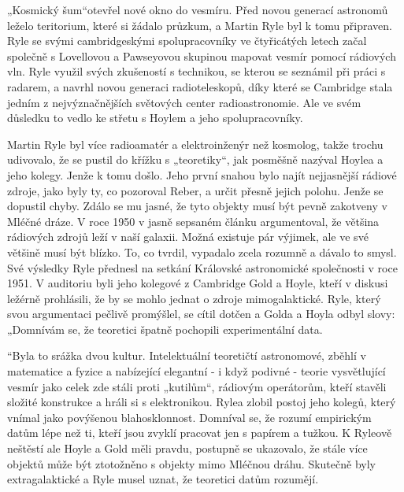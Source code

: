   „Kosmický šum“otevřel nové okno do vesmíru. Před novou generací astronomů leželo teritorium, které
  si žádalo průzkum, a Martin Ryle byl k tomu připraven. Ryle se svými cambridgeskými
  spolupracovníky ve čtyřicátých letech začal společně s Lovellovou a Pawseyovou skupinou mapovat
  vesmír pomocí rádiových vln. Ryle využil svých zkušeností s technikou, se kterou se seznámil při
  práci s radarem, a navrhl novou generaci radioteleskopů, díky které se Cambridge stala jedním z
  nejvýznačnějších světových center radioastronomie. Ale ve svém důsledku to vedlo ke střetu s
  Hoylem a jeho spolupracovníky. 

  Martin Ryle byl více radioamatér a elektroinženýr než kosmolog, takže trochu udivovalo, že se
  pustil do křížku s „teoretiky“, jak posměšně nazýval Hoylea a jeho kolegy. Jenže k tomu došlo.
  Jeho první snahou bylo najít nejjasnější rádiové zdroje, jako byly ty, co pozoroval Reber, a určit
  přesně jejich polohu. Jenže se dopustil chyby. Zdálo se mu jasné, že tyto objekty musí být pevně
  zakotveny v Mléčné dráze. V roce 1950 v jasně sepsaném článku argumentoval, že většina rádiových
  zdrojů leží v naší galaxii. Možná existuje pár výjimek, ale ve své většině musí být blízko. To, co
  tvrdil, vypadalo zcela rozumně a dávalo to smysl. Své výsledky Ryle přednesl na setkání Královské
  astronomické společnosti v roce 1951. V auditoriu byli jeho kolegové z Cambridge Gold a Hoyle,
  kteří v diskusi ležérně prohlásili, že by se mohlo jednat o zdroje mimogalaktické. Ryle, který
  svou argumentaci pečlivě promýšlel, se cítil dotčen a Golda a Hoyla odbyl slovy: „Domnívám se, že
  teoretici špatně pochopili experimentální data.

  “Byla to srážka dvou kultur. Intelektuální teoretičtí astronomové, zběhlí v matematice a fyzice a
  nabízející elegantní - i když podivné - teorie vysvětlující vesmír jako celek zde stáli proti
  „kutilům“, rádiovým operátorům, kteří stavěli složité konstrukce a hráli si s elektronikou. Rylea
  zlobil postoj jeho kolegů, který vnímal jako povýšenou blahosklonnost. Domníval se, že rozumí
  empirickým datům lépe než ti, kteří jsou zvyklí pracovat jen s papírem a tužkou. K Ryleově
  neštěstí ale Hoyle a Gold měli pravdu, postupně se ukazovalo, že stále více objektů může být
  ztotožněno s objekty mimo Mléčnou dráhu. Skutečně byly extragalaktické a Ryle musel uznat, že
  teoretici datům rozumějí. 


